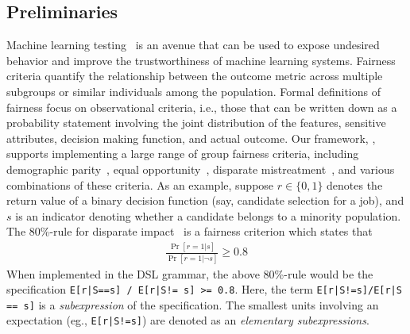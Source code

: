 \subsection{Preliminaries}
Machine learning testing~\citep{zhang2020mltesting} is an avenue that can be used to expose undesired behavior and improve the trustworthiness of machine learning systems.
Fairness criteria quantify the relationship between the outcome metric across multiple subgroups or similar individuals among the population.
Formal definitions of fairness focus on observational criteria, i.e., those that can be written down as a probability statement involving the joint distribution of the features, sensitive attributes, decision making function, and actual outcome. %
Our framework, \AVOIRmethodname{}, supports implementing a large range of group fairness criteria, including demographic parity~\citep{calders2009building}, equal opportunity~\citep{hardt2016equality}, disparate mistreatment~\citep{zafar2017fairness}, and various combinations of these criteria. 
As an example, suppose $r \in \{ 0, 1\}$ denotes the return value of a binary decision function (say, candidate selection for a job), and $s$ is an indicator denoting whether a candidate belongs to a minority population.
The 80\%-rule for disparate impact~\citep{eeoc1979,feldman2015certifying} is a fairness criterion which states that
\begin{align*}
    \frac{\Pr[r=1| s]}{\Pr[r=1| \neg s]} \geq 0.8 
\end{align*}
When implemented in the \AVOIRmethodname{} DSL grammar, the above 80\%-rule would be the specification \lstinline{E[r|S==s] / E[r|S!= s] >= 0.8}.
Here, the term \lstinline{E[r|S!=s]/E[r|S == s]} is a \textit{subexpression} of the specification.
The smallest units involving an expectation (eg., \lstinline{E[r|S!=s]}) are denoted as an \textit{elementary subexpressions}.
